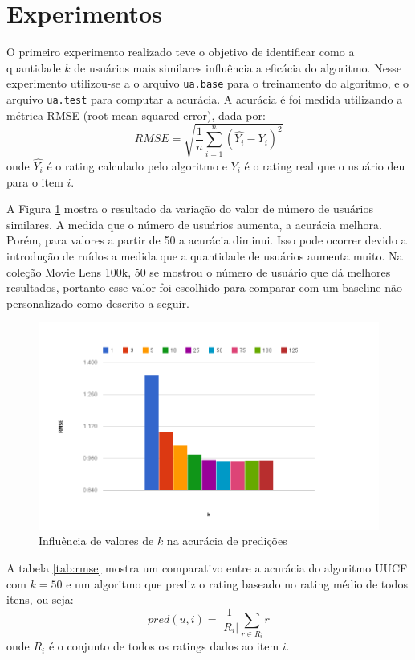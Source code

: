 \documentclass[12pt, a4paper, oneside]{article}
\begin{document}
\section{Experimentos}
\label{sec:experimentos}
O primeiro experimento realizado teve o objetivo de identificar como a quantidade $k$ de usuários mais similares
influência a eficácia do algoritmo. Nesse experimento utilizou-se a o arquivo \texttt{ua.base} para o
treinamento do algoritmo, e o arquivo \texttt{ua.test} para computar a acurácia.
A acurácia é foi medida utilizando a métrica RMSE (root mean squared error), dada por:
$$ RMSE = \sqrt{ \frac{1}{n}\sum_{i=1}^n(\hat{Y_i} - Y_i)^2} $$
onde $\hat{Y_i}$ é o rating calculado pelo algoritmo e $Y_i$ é o rating real que o usuário deu para o item $i$.

A Figura \ref{fig:uucf-rmse-k} mostra o resultado da variação do valor de número de usuários similares. A medida que o número de usuários aumenta, a acurácia melhora. Porém, para valores a partir de 50 a acurácia diminui. Isso pode ocorrer devido a introdução de ruídos a medida que a quantidade de usuários aumenta muito.
\pagebreak
Na coleção Movie Lens 100k, 50 se mostrou o número de usuário que dá melhores resultados, portanto esse valor foi escolhido para comparar com um baseline não personalizado como descrito a seguir.

\begin{figure}[!th]
\centering
\includegraphics[scale=.45]{img/uucf-rmse-k.png} 
\caption{Influência de valores de $k$ na acurácia de predições}
\label{fig:uucf-rmse-k}
\end{figure}

A tabela \ref{tab:rmse} mostra um comparativo entre a acurácia do algoritmo UUCF com $k=50$ e um algoritmo que prediz o rating baseado no rating médio de todos itens, ou seja:
$$ pred(u, i) = \frac{1}{|R_i|} \sum\limits_{r \in R_i} r $$
onde $R_i$ é o conjunto de todos os ratings dados ao item $i$.
\end{document}
